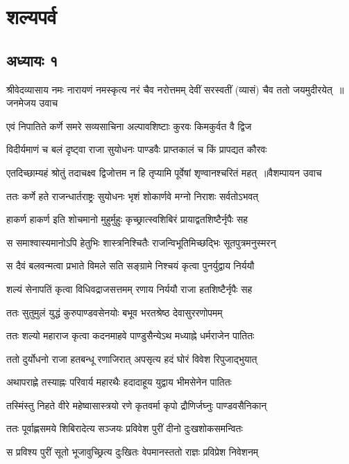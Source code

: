 \part{शल्यपर्व}
\chapter{अध्यायः १}
श्रीवेदव्यासाय नमः
\threelineshloka
{नारायणं नमस्कृत्य नरं चैव नरोत्तमम्}
{देवीं सरस्वतीं (व्यासं) चैव ततो जयमुदीरयेत् ॥जनमेजय उवाच}
{}


\twolineshloka
{एवं निपातिते कर्णे समरे सव्यसाचिना}
{अल्पावशिष्टाः कुरवः किमकुर्वत वै द्विज}


\twolineshloka
{विदीर्यमाणं च बलं दृष्ट्वा राजा सुयोधनः}
{पाण्डवैः प्राप्तकालं च किं प्रापद्यत कौरवः}


\threelineshloka
{एतदिच्छाम्यहं श्रोतुं तदाचक्ष्व द्विजोत्तम}
{न हि तृप्यामि पूर्वेषां शृण्वानश्चरितं महत् ॥वैशम्पायन उवाच}
{}


\twolineshloka
{ततः कर्णे हते राजन्धार्तराष्ट्रः सुयोधनः}
{भृशं शोकार्णवे मग्नो निराशः सर्वतोऽभवत्}


\twolineshloka
{हाकर्ण हाकर्ण इति शोचमानो मुहुर्मुहुः}
{कृच्छ्रात्स्वशिबिरं प्रायाद्वतशिष्टैर्नृपैः सह}


\twolineshloka
{स समाश्वास्यमानोऽपि हेतुभिः शास्त्रनिश्चितैः}
{राजन्विभूतिमिच्छद्भिः सूतपुत्रमनुस्मरन्}


\twolineshloka
{स दैवं बलवन्मत्वा प्रभाते विमले सति}
{सङ्ग्रामे निश्चयं कृत्वा पुनर्युद्वाय निर्ययौ}


\twolineshloka
{शल्यं सेनापतिं कृत्वा विधिवद्राजसत्तमम्}
{रणाय निर्ययौ राजा हतशिष्टैर्नृपैः सह}


\twolineshloka
{ततः सुतुमुलं युद्धं कुरुपाण्डवसेनयोः}
{बभूव भरतश्रेष्ठ देवासुररणोपमम्}


\twolineshloka
{ततः शल्यो महाराज कृत्वा कदनमाहवे}
{पाण्डुसैन्येऽथ मध्याह्ने धर्मराजेन पातितः}


\twolineshloka
{ततो दुर्योधनो राजा हतबन्धू रणाजिरात्}
{अपसृत्य हदं घोरं विवेश रिपुजाद्भुयात्}


\twolineshloka
{अथापराह्णे तस्याह्नः परिवार्य महारथैः}
{हदादाहूय युद्वाय भीमसेनेन पातितः}


\twolineshloka
{तस्मिंस्तु निहते वीरे महेष्वासास्त्रयो रणे}
{कृतवर्मा कृपो द्रौणिर्जघ्नुः पाण्डवसैनिकान्}


\twolineshloka
{ततः पूर्वाह्णसमये शिबिरादेत्य सञ्जयः}
{प्रविवेश पुरीं दीनो दुःखशोकसमन्वितः}


\twolineshloka
{स प्रविश्य पुरीं सूतो भूजावुच्छ्रित्य दुःखितः}
{वेपमानस्ततो राज्ञः प्रविप्रेश निवेशनम्}


